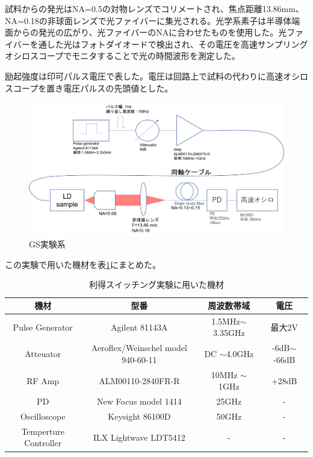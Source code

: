 試料からの発光はNA=0.5の対物レンズでコリメートされ、焦点距離13.86mm、NA=0.18の非球面レンズで光ファイバーに集光される。光学系素子は半導体端面からの発光の広がり、光ファイバーのNAに合わせたものを使用した。光ファイバーを通した光はフォトダイオードで検出され、その電圧を高速サンプリングオシロスコープでモニタすることで光の時間波形を測定した。

励起強度は印可パルス電圧で表した。電圧は回路上で試料の代わりに高速オシロスコープを置き電圧パルスの先頭値とした。
\begin{figure}[h]
	\includegraphics[width=15cm]{figure/fig_2_3_GS_setup.png}
	\caption{GS実験系}
	\label{fig:fig_2_3_GS_setup}
\end{figure}


この実験で用いた機材を表\ref{table:table_2_2_GS_setup}にまとめた。
\begin{table}[h]
  \caption{利得スイッチング実験に用いた機材}
  \label{table:table_2_2_GS_setup}
  \centering
  \begin{tabular}{cccc}
    \hline
    機材  & 型番   & 周波数帯域 &電圧 \\
    \hline \hline
    Pulse Generator  & Agilent 81143A & 1.5MHz$\sim$ 3.35GHz  &最大2V \\
    Atteuator  &  Aeroflex/Weinschel model 940-60-11    & DC $\sim$4.0GHz& -6dB$\sim$ -66dB\\
    RF Amp & ALM00110-2840FR-R & 10MHz $\sim$ 1GHz & +28dB\\
    PD & New Focus model 1414 & 25GHz &-\\
    Oscilloscope  &  Keysight 86100D & 50GHz  &-\\
     Temperture Controller & ILX Lightwave  LDT5412&-&-\\
       \hline
  \end{tabular}
\end{table}
